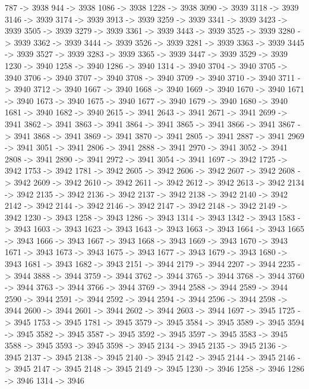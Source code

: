 {	787 -> 3938
	944 -> 3938
	1086 -> 3938
	1228 -> 3938
	3090 -> 3939
	3118 -> 3939
	3146 -> 3939
	3174 -> 3939
	3913 -> 3939
	3259 -> 3939
	3341 -> 3939
	3423 -> 3939
	3505 -> 3939
	3279 -> 3939
	3361 -> 3939
	3443 -> 3939
	3525 -> 3939
	3280 -> 3939
	3362 -> 3939
	3444 -> 3939
	3526 -> 3939
	3281 -> 3939
	3363 -> 3939
	3445 -> 3939
	3527 -> 3939
	3283 -> 3939
	3365 -> 3939
	3447 -> 3939
	3529 -> 3939
	1230 -> 3940
	1258 -> 3940
	1286 -> 3940
	1314 -> 3940
	3704 -> 3940
	3705 -> 3940
	3706 -> 3940
	3707 -> 3940
	3708 -> 3940
	3709 -> 3940
	3710 -> 3940
	3711 -> 3940
	3712 -> 3940
	1667 -> 3940
	1668 -> 3940
	1669 -> 3940
	1670 -> 3940
	1671 -> 3940
	1673 -> 3940
	1675 -> 3940
	1677 -> 3940
	1679 -> 3940
	1680 -> 3940
	1681 -> 3940
	1682 -> 3940
	2615 -> 3941
	2643 -> 3941
	2671 -> 3941
	2699 -> 3941
	3862 -> 3941
	3863 -> 3941
	3864 -> 3941
	3865 -> 3941
	3866 -> 3941
	3867 -> 3941
	3868 -> 3941
	3869 -> 3941
	3870 -> 3941
	2805 -> 3941
	2887 -> 3941
	2969 -> 3941
	3051 -> 3941
	2806 -> 3941
	2888 -> 3941
	2970 -> 3941
	3052 -> 3941
	2808 -> 3941
	2890 -> 3941
	2972 -> 3941
	3054 -> 3941
	1697 -> 3942
	1725 -> 3942
	1753 -> 3942
	1781 -> 3942
	2605 -> 3942
	2606 -> 3942
	2607 -> 3942
	2608 -> 3942
	2609 -> 3942
	2610 -> 3942
	2611 -> 3942
	2612 -> 3942
	2613 -> 3942
	2134 -> 3942
	2135 -> 3942
	2136 -> 3942
	2137 -> 3942
	2138 -> 3942
	2140 -> 3942
	2142 -> 3942
	2144 -> 3942
	2146 -> 3942
	2147 -> 3942
	2148 -> 3942
	2149 -> 3942
	1230 -> 3943
	1258 -> 3943
	1286 -> 3943
	1314 -> 3943
	1342 -> 3943
	1583 -> 3943
	1603 -> 3943
	1623 -> 3943
	1643 -> 3943
	1663 -> 3943
	1664 -> 3943
	1665 -> 3943
	1666 -> 3943
	1667 -> 3943
	1668 -> 3943
	1669 -> 3943
	1670 -> 3943
	1671 -> 3943
	1673 -> 3943
	1675 -> 3943
	1677 -> 3943
	1679 -> 3943
	1680 -> 3943
	1681 -> 3943
	1682 -> 3943
	2151 -> 3944
	2179 -> 3944
	2207 -> 3944
	2235 -> 3944
	3888 -> 3944
	3759 -> 3944
	3762 -> 3944
	3765 -> 3944
	3768 -> 3944
	3760 -> 3944
	3763 -> 3944
	3766 -> 3944
	3769 -> 3944
	2588 -> 3944
	2589 -> 3944
	2590 -> 3944
	2591 -> 3944
	2592 -> 3944
	2594 -> 3944
	2596 -> 3944
	2598 -> 3944
	2600 -> 3944
	2601 -> 3944
	2602 -> 3944
	2603 -> 3944
	1697 -> 3945
	1725 -> 3945
	1753 -> 3945
	1781 -> 3945
	3579 -> 3945
	3584 -> 3945
	3589 -> 3945
	3594 -> 3945
	3582 -> 3945
	3587 -> 3945
	3592 -> 3945
	3597 -> 3945
	3583 -> 3945
	3588 -> 3945
	3593 -> 3945
	3598 -> 3945
	2134 -> 3945
	2135 -> 3945
	2136 -> 3945
	2137 -> 3945
	2138 -> 3945
	2140 -> 3945
	2142 -> 3945
	2144 -> 3945
	2146 -> 3945
	2147 -> 3945
	2148 -> 3945
	2149 -> 3945
	1230 -> 3946
	1258 -> 3946
	1286 -> 3946
	1314 -> 3946
}
